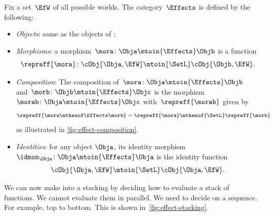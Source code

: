 \begin{definition}
    \label{def:Effects}
    Fix a set~$\EfW$ of all possible worlds.
    The category~$\Effects$ is defined by the following:
    \begin{itemize}
        \item \emph{Objects}: same as the objects of \SetL;
        \item \emph{Morphisms}: a morphism~$\mora\colon \Obja \mtoin{\Effects} \Objb$ is a function
              \begin{equation}
                  \repreff{\mora}\colon \cObj{\Obja, \EfW} \mtoin{\SetL} \cObj{\Objb, \EfW}.
              \end{equation}
        \item \emph{Composition}: The composition of~$\mora\colon \Obja \mtoin{\Effects} \Objb$ and~$\morb\colon \Objb \mtoin{\Effects} \Objc$ is the morphism~$\morab\colon \Obja \mtoin{\Effects} \Objc$ with~$\repreff{\morab}$ given by
              \begin{equation}
                  \repreff{\mora \mthenof \Effects \morb}
                  = \repreff{\mora} \mthenof{\SetL} \repreff{\morb}
              \end{equation}
              as illustrated in \cref{fig:effect-composition}.
        \item \emph{Identities}: for any object $\Obja$, its identity morphism $\idmon_\Obja \colon \Obja \mtoin{\Effects} \Obja$ is the identity function
        \begin{equation}
                  \cObj{\Obja, \EfW} \mtoin{\SetL} \cObj{\Obja, \EfW}.
              \end{equation}
    \end{itemize}
\end{definition}

\begin{marginfigure}
    \centering

    \caption{}
    \label{fig:effect-stacking}
\end{marginfigure}

We can now make \Effects into a stacking  by deciding how to evaluate a stack of functions.
We cannot evaluate them in parallel.
We need to decide on a sequence.
For example, top to bottom.
This is shown in~\cref{fig:effect-stacking}.

